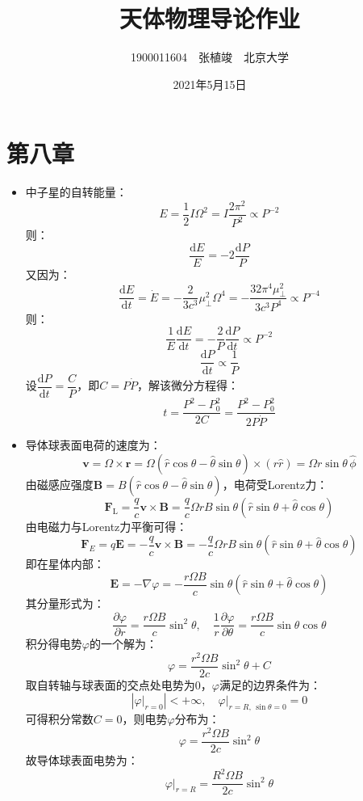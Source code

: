 \documentclass[a4paper,fontset=none]{ctexart}
\begin{document}
    \title{\textbf{天体物理导论作业}}
    \author{1900011604\ \ 张植竣\ \ 北京大学}
    \date{2021年5月15日}

    \maketitle

    \section*{第八章}

    \begin{itemize}

        \item[2.]
        中子星的自转能量：
        \[
        E = \frac{1}{2}I\varOmega^2 = I\frac{2\pi^2}{P^2} \propto P^{-2}
        \]
        则：
        \[
        \frac{\mathrm{d}E}{E} = -2\frac{\mathrm{d}P}{P}
        \]
        又因为：
        \[
        \frac{\mathrm{d}E}{\mathrm{d}t} = \dot{E} = -\frac{2}{3c^3}\mu_\perp^2\varOmega^4 = -\frac{32\pi^4\mu_\perp^2}{3c^3 P^4} \propto P^{-4}
        \]
        则：
        \[
        \frac{1}{E}\frac{\mathrm{d}E}{\mathrm{d}t} = -\frac{2}{P}\frac{\mathrm{d}P}{\mathrm{d}t} \propto P^{-2}
        \]
        \[
        \frac{\mathrm{d}P}{\mathrm{d}t} \propto \frac{1}{P}
        \]
        设$\dfrac{\mathrm{d}P}{\mathrm{d}t} = \dfrac{C}{P}$，即$C = P\dot{P}$，解该微分方程得：
        \[
        t = \frac{P^2 - P_0^2}{2C} = \frac{P^2 - P_0^2}{2P\dot{P}}
        \]

        \item[3.]
        导体球表面电荷的速度为：
        \[
        \bm{v} = \bm{\varOmega}\times\bm{r} = \varOmega(\hat{r}\cos\theta - \hat{\theta}\sin\theta)\times(r\hat{r}) = \varOmega r\sin\theta\,\hat{\phi}
        \]
        由磁感应强度$\bm{B} = B(\hat{r}\cos\theta - \hat{\theta}\sin\theta)$，电荷受Lorentz力：
        \[
        \bm{F}_{\mathrm{L}} = \frac{q}{c}\bm{v}\times\bm{B} = \frac{q}{c}\varOmega rB\sin\theta(\hat{r}\sin\theta + \hat{\theta}\cos\theta)
        \]
        由电磁力与Lorentz力平衡可得：
        \[
        \bm{F}_{E} = q\bm{E} = -\frac{q}{c}\bm{v}\times\bm{B} = -\frac{q}{c}\varOmega rB\sin\theta(\hat{r}\sin\theta + \hat{\theta}\cos\theta)
        \]
        即在星体内部：
        \[
        \bm{E} = -\nabla\varphi = -\frac{r\varOmega B}{c}\sin\theta(\hat{r}\sin\theta + \hat{\theta}\cos\theta)
        \]
        其分量形式为：
        \[
        \frac{\partial\varphi}{\partial r} = \frac{r\varOmega B}{c}\sin^2\theta,\quad \frac{1}{r}\frac{\partial\varphi}{\partial \theta} = \frac{r\varOmega B}{c}\sin\theta\cos\theta
        \]
        积分得电势$\varphi$的一个解为：
        \[
        \varphi = \frac{r^2\varOmega B}{2c}\sin^2\theta + C
        \]
        取自转轴与球表面的交点处电势为0，$\varphi$满足的边界条件为：
        \[
        \left|\left.\varphi\right|_{r=0}\right| < +\infty,\quad \left.\varphi\right|_{r=R,\,\sin\theta=0} = 0
        \]
        可得积分常数$C=0$，则电势$\varphi$分布为：
        \[
        \varphi = \frac{r^2\varOmega B}{2c}\sin^2\theta
        \]
        故导体球表面电势为：
        \[
        \left.\varphi\right|_{r=R} = \frac{R^2\varOmega B}{2c}\sin^2\theta
        \]


\end{itemize}
\end{document}
